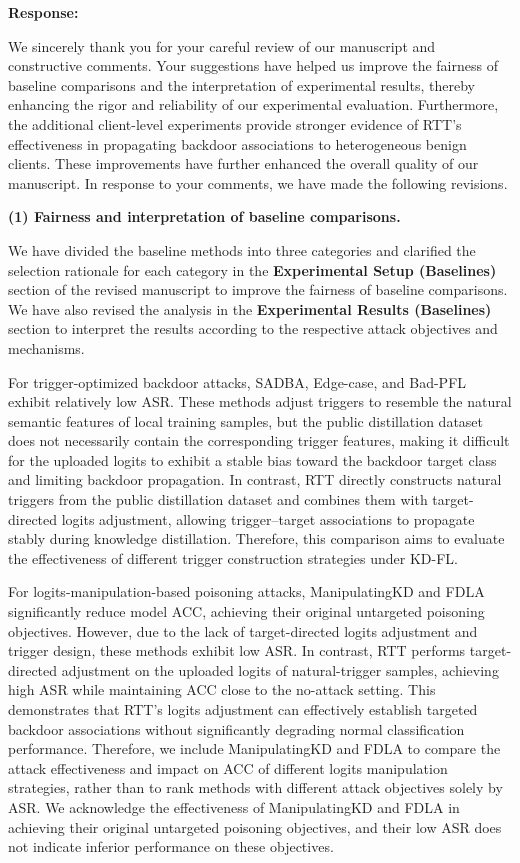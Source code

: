 \documentclass[11pt,a4paper]{article}
\newcommand{\manualindent}{\par\noindent\hspace*{1.5em}\ignorespaces}
\newcommand{\authorresponse}[1]{%
  {\bfseries\color{replyblue}Response:}\par
  #1\par\vspace{0.35em}%
}
\begin{document}
\authorresponse{\manualindent We sincerely thank you for your careful review of our manuscript and constructive comments. 
Your suggestions have helped us improve the fairness of baseline comparisons and the interpretation of experimental results, thereby enhancing the rigor and reliability of our experimental evaluation. 
Furthermore, the additional client-level experiments provide stronger evidence of RTT's effectiveness in propagating backdoor associations to heterogeneous benign clients. 
These improvements have further enhanced the overall quality of our manuscript. 
In response to your comments, we have made the following revisions.

\textbf{(1) Fairness and interpretation of baseline comparisons.}
\manualindent We have divided the baseline methods into three categories and clarified the selection rationale for each category in the \textbf{Experimental Setup (Baselines)} section of the revised manuscript to improve the fairness of baseline comparisons.
We have also revised the analysis in the \textbf{Experimental Results (Baselines)} section to interpret the results according to the respective attack objectives and mechanisms.

\manualindent For trigger-optimized backdoor attacks, SADBA, Edge-case, and Bad-PFL exhibit relatively low ASR. 
These methods adjust triggers to resemble the natural semantic features of local training samples, but the public distillation dataset does not necessarily contain the corresponding trigger features, making it difficult for the uploaded logits to exhibit a stable bias toward the backdoor target class and limiting backdoor propagation.
In contrast, RTT directly constructs natural triggers from the public distillation dataset and combines them with target-directed logits adjustment, allowing trigger--target associations to propagate stably during knowledge distillation.
Therefore, this comparison aims to evaluate the effectiveness of different trigger construction strategies under KD-FL.

\manualindent For logits-manipulation-based poisoning attacks, ManipulatingKD and FDLA significantly reduce model ACC, achieving their original untargeted poisoning objectives.
However, due to the lack of target-directed logits adjustment and trigger design, these methods exhibit low ASR.
In contrast, RTT performs target-directed adjustment on the uploaded logits of natural-trigger samples, achieving high ASR while maintaining ACC close to the no-attack setting.
This demonstrates that RTT's logits adjustment can effectively establish targeted backdoor associations without significantly degrading normal classification performance.
Therefore, we include ManipulatingKD and FDLA to compare the attack effectiveness and impact on ACC of different logits manipulation strategies, rather than to rank methods with different attack objectives solely by ASR.
We acknowledge the effectiveness of ManipulatingKD and FDLA in achieving their original untargeted poisoning objectives, and their low ASR does not indicate inferior performance on these objectives.

}
\end{document}
